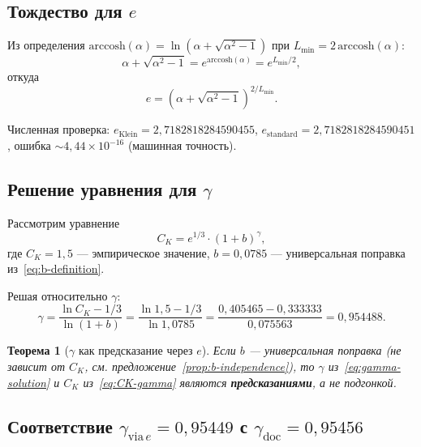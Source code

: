 \documentclass[11pt,a4paper,twoside]{article}
\newtheorem{theorem}{Теорема}[section]
\theoremstyle{remark}
\begin{document}
\subsection{Тождество для \texorpdfstring{$e$}{e}}

Из определения $\mathrm{arccosh}(\alpha) = \ln(\alpha + \sqrt{\alpha^2-1})$ при $L_{\min} = 2\,\mathrm{arccosh}(\alpha)$:
\begin{equation}
\alpha + \sqrt{\alpha^2-1} = e^{\mathrm{arccosh}(\alpha)} = e^{L_{\min}/2},
\label{eq:arccosh-identity}
\end{equation}
откуда
\begin{equation}
e = \left(\alpha + \sqrt{\alpha^2-1}\right)^{2/L_{\min}}.
\label{eq:e-identity}
\end{equation}

Численная проверка: $e_{\mathrm{Klein}} = 2{,}7182818284590455$, $e_{\mathrm{standard}} = 2{,}7182818284590451$, ошибка $\sim 4{,}44\times 10^{-16}$ (машинная точность).

\subsection{Решение уравнения для \texorpdfstring{$\gamma$}{gamma}}

Рассмотрим уравнение
\begin{equation}
C_K = e^{1/3}\cdot(1+b)^\gamma,
\label{eq:CK-gamma}
\end{equation}
где $C_K = 1{,}5$ --- эмпирическое значение, $b = 0{,}0785$ --- универсальная поправка из~\eqref{eq:b-definition}.

Решая относительно $\gamma$:
\begin{equation}
\gamma = \frac{\ln C_K - 1/3}{\ln(1+b)} = \frac{\ln 1{,}5 - 1/3}{\ln 1{,}0785} = \frac{0{,}405465 - 0{,}333333}{0{,}075563} = 0{,}954488.
\label{eq:gamma-solution}
\end{equation}

\begin{theorem}[$\gamma$ как предсказание через $e$]
\label{thm:gamma-prediction}
Если $b$ --- универсальная поправка (не зависит от $C_K$, см. предложение~\ref{prop:b-independence}), то $\gamma$ из~\eqref{eq:gamma-solution} и $C_K$ из~\eqref{eq:CK-gamma} являются \textbf{предсказаниями}, а не подгонкой.
\end{theorem}

\subsection{Соответствие $\gamma_{\mathrm{via}\,e} = 0{,}95449$ с $\gamma_{\mathrm{doc}} = 0{,}95456$}
\end{document}

